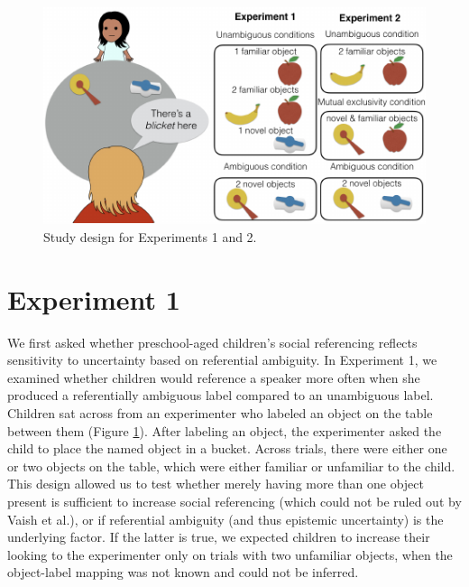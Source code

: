 \documentclass[10pt, letterpaper]{article}
\newenvironment{CodeChunk}{}{}
\begin{document}
\begin{CodeChunk}
\captionsetup{width=0.8\columnwidth}\begin{figure}[h]

{\centering \includegraphics{figs/design-1} 

}

\caption[Study design for Experiments 1 and 2]{Study design for Experiments 1 and 2.}\label{fig:design}
\end{figure}
\end{CodeChunk}

\section{Experiment 1}\label{experiment-1}

We first asked whether preschool-aged children's social referencing
reflects sensitivity to uncertainty based on referential ambiguity. In
Experiment 1, we examined whether children would reference a speaker
more often when she produced a referentially ambiguous label compared to
an unambiguous label. Children sat across from an experimenter who
labeled an object on the table between them (Figure \ref{fig:design}).
After labeling an object, the experimenter asked the child to place the
named object in a bucket. Across trials, there were either one or two
objects on the table, which were either familiar or unfamiliar to the
child. This design allowed us to test whether merely having more than
one object present is sufficient to increase social referencing (which
could not be ruled out by Vaish et al.), or if referential ambiguity
(and thus epistemic uncertainty) is the underlying factor. If the latter
is true, we expected children to increase their looking to the
experimenter only on trials with two unfamiliar objects, when the
object-label mapping was not known and could not be inferred.
\end{document}
